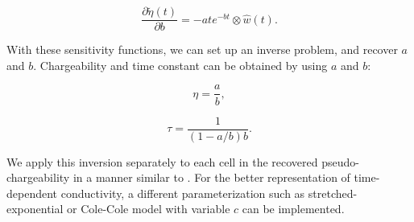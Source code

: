 \documentclass[letterpaper,11pt]{article}
\newcommand{\peta}{\tilde{\eta}}
\begin{document}
\begin{linenomath*}
\begin{equation}
  \frac{\partial \peta(t)}{\partial b} = -ate^{-bt} \otimes \hat{w}(t).
\end{equation}
\end{linenomath*}
With these sensitivity functions, we can set up an inverse problem, and recover $a$ and $b$. 
Chargeability and time constant can be obtained by using $a$ and $b$:
\begin{linenomath*}
\begin{equation}
  \eta =  \frac{a}{b},
\end{equation}
\end{linenomath*}
\begin{linenomath*}
\begin{equation}
  \tau =  \frac{1}{(1-a/b)b}.
\end{equation}
\end{linenomath*}
We apply this inversion separately to each cell in the recovered pseudo-chargeability  in a manner similar to \cite[]{Yuval1997}.
For the better representation of time-dependent conductivity, a different parameterization such as stretched-exponential \cite[]{Kohlrausch1854} or Cole-Cole model with variable $c$ can be implemented. 
\end{document}

